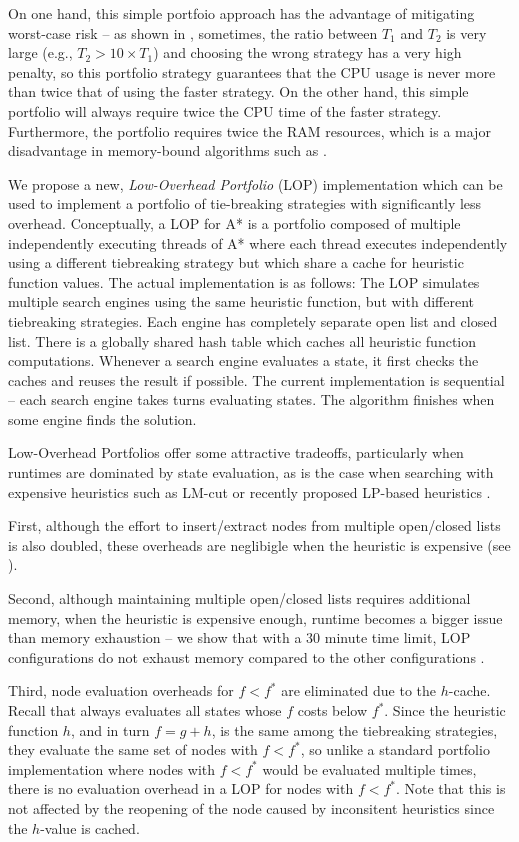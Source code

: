 On one hand, this simple portfoio approach has the advantage of mitigating worst-case risk -- as shown in , sometimes, the ratio between $T_1$ and $T_2$ is very large (e.g., $T_2 > 10\times T_1$) and choosing the wrong strategy has a very high penalty, so this portfolio strategy guarantees that the CPU usage is never more than twice that of using the faster strategy.
On the other hand, this simple portfolio will always require twice the CPU time of the faster strategy. Furthermore, the portfolio requires twice the RAM resources, which is a major disadvantage in memory-bound algorithms such as \astar.

We propose a new, \emph{Low-Overhead Portfolio} (LOP) implementation which can be used to implement a portfolio of tie-breaking strategies with significantly less overhead.
Conceptually, a LOP for A* is a portfolio composed of multiple independently executing threads of A*  where each thread  executes independently using a different tiebreaking strategy but which share a cache for heuristic function values.
The actual implementation is as follows:
The LOP simulates
multiple search engines using the same heuristic function, but with
different tiebreaking strategies.  Each engine has completely separate
open list and closed list.  There is a globally shared hash
table which caches all heuristic function computations.  Whenever a
search engine evaluates a state, it first checks the caches and 
reuses the result if possible.  The current implementation is sequential -- each search engine takes  turns 
evaluating states. The algorithm finishes when some engine finds the solution.


Low-Overhead Portfolios offer some attractive tradeoffs,
particularly when runtimes are dominated by state evaluation, as is the case when searching with 
expensive heuristics such as LM-cut or recently proposed LP-based heuristics \cite{Pommereningetal14}.

First, although the effort to insert/extract nodes from multiple open/closed lists is also doubled, these overheads
are neglibigle when the heuristic is expensive (see ).

Second, although maintaining multiple open/closed lists requires additional memory,
when the heuristic is expensive enough, runtime becomes a bigger issue than memory exhaustion  -- we show that with a 30 minute time limit, LOP configurations do not exhaust memory compared to the other configurations .

Third, node evaluation overheads for $f < f^*$ are eliminated due to the $h$-cache.
Recall that \astar always evaluates all states whose $f$ costs 
below $f^*$. Since the heuristic function $h$, and in turn $f=g+h$, is
the same among the tiebreaking strategies, they evaluate the same set of
nodes with $f<f^*$, so unlike a standard portfolio implementation where 
nodes with $f<f^*$ would be evaluated multiple times, there is no evaluation overhead in a LOP
for nodes with $f<f^*$.
Note that this is not
affected by the reopening of the node caused by inconsitent heuristics
since the $h$-value is cached.

